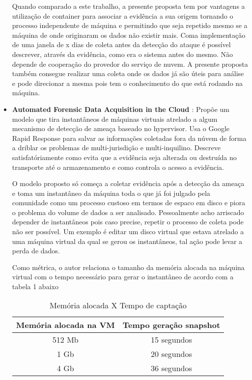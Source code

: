 \documentclass[
	12pt,				%
	openright,			%
	oneside,			%
	a4paper,			%
	english,			%
	french,				%
	spanish,			%
	brazil,				%
	]{abntex2}
\begin{document}
\begin{itemize}
Quando comparado a este trabalho, a presente proposta tem por vantagens a utilização de container para associar a evidência a sua origem tornando o processo 
independente de máquina e permitindo que seja repetido mesmo se a máquina de onde originaram os dados não existir mais. Coma implementação de uma janela 
de x dias de coleta antes da detecção do ataque é possível descrever, através da evidência, como era o sistema antes do mesmo. Não depende de cooperação do provedor 
do serviço de nuvem. A presente proposta também consegue realizar uma coleta onde os dados já são úteis para análise e pode direcionar a mesma pois tem o conhecimento 
do que está rodando na máquina. \\
  
\item \textbf{Automated Forensic Data Acquisition in the Cloud \cite{Reichert2015} }: Propõe um modelo que tira instantâneos de máquinas virtuais atrelado a algum mecanismo de
detecção de ameaça baseado no hypervisor. Usa o Google Rapid Response para salvar as informações coletadas fora da núvem de forma a driblar os problemas de multi-jurisdição e 
multi-inquilino. Descreve satisfatóriamente como evita que a evidência seja alterada ou destruída no transporte até o armazenamento e como controla o acesso a evidência.

O modelo proposto só começa a coletar evidência após a detecção da ameaça e toma um instantâneo da máquina toda o que já foi julgado pela comunidade como um processo custoso em
termos de espaco em disco e piora o problema do volume de dados a ser analisado. Pessoalmente acho arriscado depender de instantâneos pois caso precise, repetir o processo de coleta
pode não ser possível. Um exemplo é editar um disco virtual que estava atrelado a uma máquina virtual da qual se gerou os instantâneos, tal ação pode levar a perda de dados.

Como métrica, o autor relaciona o tamanho da memória alocada na máquina virtual com o tempo necessário para gerar o instantâneo de acordo com a tabela 1 abaixo

\begin{table}[h!]
\centering
\caption{Memória alocada X Tempo de captação}
\label{my-label}
\begin{tabular}{c|c}
\hline
\textbf{Memória alocada na VM} & \textbf{Tempo geração snapshot} \\ \hline
512 Mb                         & 15 segundos                     \\ \hline
1 Gb                           & 20 segundos                     \\ \hline
4 Gb                           & 36 segundos                     \\ \hline
\end{tabular}
\end{table}


\end{itemize}
\end{document}
